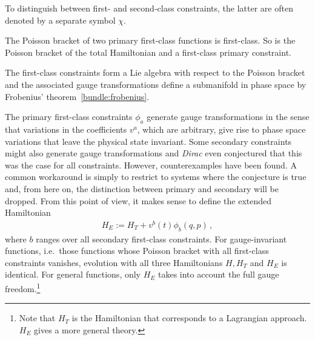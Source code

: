     \begin{notation}
        To distinguish between first- and second-class constraints, the latter are often denoted by a separate symbol $\chi$.
    \end{notation}
    \begin{property}[Closure]
        The Poisson bracket of two primary first-class functions is first-class. So is the Poisson bracket of the total Hamiltonian and a first-class primary constraint.
    \end{property}
    \begin{result}
        The first-class constraints form a Lie algebra with respect to the Poisson bracket and the associated gauge transformations define a submanifold in phase space by Frobenius' theorem~\ref{bundle:frobenius}.
    \end{result}

    \begin{remark}
        The primary first-class constraints $\phi_a$ generate gauge transformations in the sense that variations in the coefficients $v^a$, which are arbitrary, give rise to phase space variations that leave the physical state invariant. Some secondary constraints might also generate gauge transformations and \textit{Dirac} even conjectured that this was the case for all constraints. However, counterexamples have been found. A common workaround is simply to restrict to systems where the conjecture is true and, from here on, the distinction between primary and secondary will be dropped. From this point of view, it makes sense to define the extended Hamiltonian
        \begin{gather}
            H_E := H_T + v^b(t)\phi_b(q,p)\,,
        \end{gather}
        where $b$ ranges over all secondary first-class constraints. For gauge-invariant functions, i.e.~those functions whose Poisson bracket with all first-class constraints vanishes, evolution with all three Hamiltonians $H,H_T$ and $H_E$ is identical. For general functions, only $H_E$ takes into account the full gauge freedom.\footnote{Note that $H_T$ is the Hamiltonian that corresponds to a Lagrangian approach. $H_E$ gives a more general theory.}
    \end{remark}

